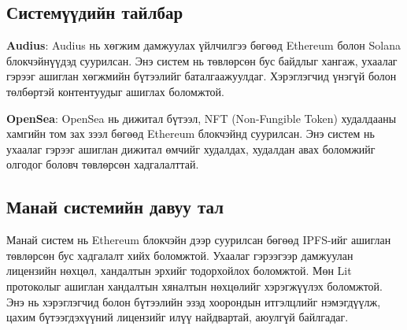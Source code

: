\subsection{Системүүдийн тайлбар}
\textbf{Audius}: Audius нь хөгжим дамжуулах үйлчилгээ бөгөөд Ethereum болон Solana блокчэйнүүдэд суурилсан. Энэ систем нь төвлөрсөн бус байдлыг хангаж, ухаалаг гэрээг ашиглан хөгжмийн бүтээлийг баталгаажуулдаг. Хэрэглэгчид үнэгүй болон төлбөртэй контентуудыг ашиглах боломжтой.

\textbf{OpenSea}: OpenSea нь дижитал бүтээл, NFT (Non-Fungible Token) худалдааны хамгийн том зах зээл бөгөөд Ethereum блокчэйнд суурилсан. Энэ систем нь ухаалаг гэрээг ашиглан дижитал өмчийг худалдах, худалдан авах боломжийг олгодог боловч төвлөрсөн хадгалалттай.

\pagebreak
\subsection{Манай системийн давуу тал}
Манай систем нь Ethereum блокчэйн дээр суурилсан бөгөөд IPFS-ийг ашиглан төвлөрсөн бус хадгалалт хийх боломжтой. Ухаалаг гэрээгээр дамжуулан лицензийн нөхцөл, хандалтын эрхийг тодорхойлох боломжтой. Мөн Lit протоколыг ашиглан хандалтын хяналтын нөхцөлийг хэрэгжүүлэх боломжтой. Энэ нь хэрэглэгчид болон бүтээлийн эзэд хоорондын итгэлцлийг нэмэгдүүлж, цахим бүтээгдэхүүний лицензийг илүү найдвартай, аюулгүй байлгадаг.